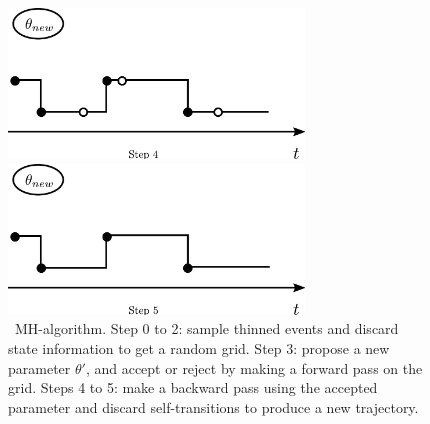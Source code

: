 \begin{figure}[H]
\begin{minipage}[!hp]{0.45\linewidth}
    \vspace{-0 in}
  \end{minipage}
  \begin{minipage}[!hp]{0.45\linewidth}
  \centering
    \includegraphics [width=0.70\textwidth, angle=0]{figs/plotn4.pdf}
    \vspace{-0 in}
  \end{minipage}
  \begin{minipage}[!hp]{0.45\linewidth}
  \centering
    \includegraphics [width=0.70\textwidth, angle=0]{figs/plotn5.pdf}
    \vspace{-0 in}
  \end{minipage}
  \caption{\Naive\ MH-algorithm. Step 0 to 2: sample thinned events
  and discard state information to get a random grid. Step 3: 
propose a new parameter $\theta'$, and accept or reject by making
a forward pass on the grid. Steps 4 to 5: make a backward pass using
the accepted parameter and discard self-transitions to produce a new
trajectory.}
   \label{fig:naive_mh}

  \end{figure}

